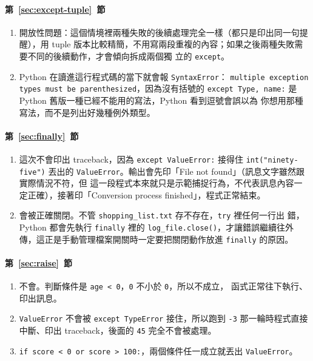 \paragraph{第~\ref{sec:except-tuple}~節}
\begin{enumerate}
\item 開放性問題：這個情境裡兩種失敗的後續處理完全一樣（都只是印出同一句提醒），用 tuple
版本比較精簡，不用寫兩段重複的內容；如果之後兩種失敗需要不同的後續動作，才會傾向拆成兩個獨
立的 \texttt{except}。
\item Python 在讀進這行程式碼的當下就會報 \texttt{SyntaxError}：
\texttt{multiple exception types must be parenthesized}，因為沒有括號的
\texttt{except Type, name:} 是 Python 舊版一種已經不能用的寫法，Python 看到逗號會誤以為
你想用那種寫法，而不是列出好幾種例外類型。
\end{enumerate}

\paragraph{第~\ref{sec:finally}~節}
\begin{enumerate}
\item 這次不會印出 traceback，因為 \texttt{except ValueError:} 接得住 \texttt{int("ninety-five")}
丟出的 \texttt{ValueError}。輸出會先印「File not found」（訊息文字雖然跟實際情況不符，但
這一段程式本來就只是示範捕捉行為，不代表訊息內容一定正確），接著印「Conversion process
finished」，程式正常結束。
\item 會被正確關閉。不管 \texttt{shopping\_list.txt} 存不存在，\texttt{try} 裡任何一行出
錯，Python 都會先執行 \texttt{finally} 裡的 \texttt{log\_file.close()}，才讓錯誤繼續往外
傳，這正是手動管理檔案開關時一定要把關閉動作放進 \texttt{finally} 的原因。
\end{enumerate}

\paragraph{第~\ref{sec:raise}~節}
\begin{enumerate}
\item 不會。判斷條件是 \texttt{age < 0}，\texttt{0} 不小於 \texttt{0}，所以不成立，
函式正常往下執行、印出訊息。
\item \texttt{ValueError} 不會被 \texttt{except TypeError} 接住，所以跑到 \texttt{-3}
那一輪時程式直接中斷、印出 traceback，後面的 \texttt{45} 完全不會被處理。
\item \texttt{if score < 0 or score > 100:}，兩個條件任一成立就丟出 \texttt{ValueError}。
\end{enumerate}

